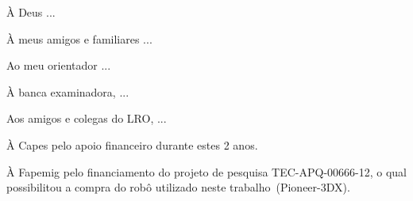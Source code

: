 \begin{agradecimentos}
À Deus ...

À meus amigos e familiares ...

Ao meu orientador ...

À banca examinadora, ...

Aos amigos e colegas do LRO, ...

À Capes pelo apoio financeiro durante estes 2 anos. 

À Fapemig pelo financiamento do projeto de pesquisa TEC-APQ-00666-12, o qual possibilitou a compra do robô utilizado neste trabalho~(Pioneer-3DX).
\end{agradecimentos}
\newpage